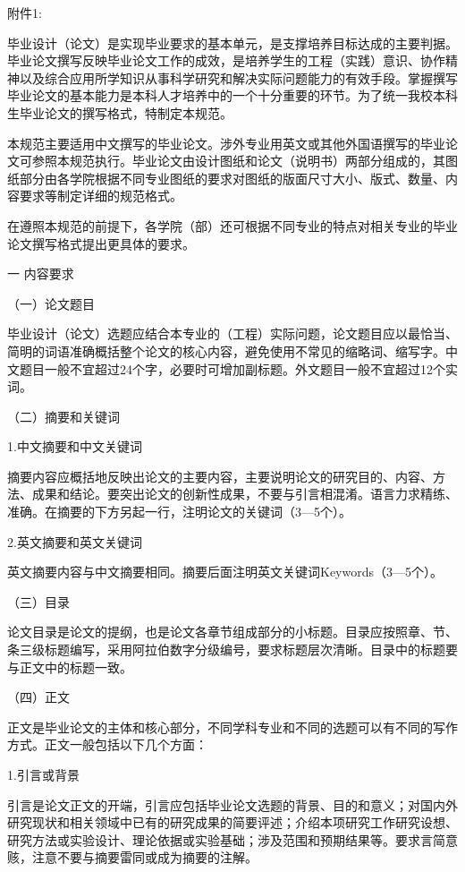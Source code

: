 \xiaosi \song
\noindent 附件1:
\begin{center}
    \hei\sihao{\appendixtitle}
\end{center}
\vspace*{14pt} %

毕业设计（论文）是实现毕业要求的基本单元，是支撑培养目标达成的主要判据。毕业论文撰写反映毕业论文工作的成效，是培养学生的工程（实践）意识、协作精神以及综合应用所学知识从事科学研究和解决实际问题能力的有效手段。掌握撰写毕业论文的基本能力是本科人才培养中的一个十分重要的环节。为了统一我校本科生毕业论文的撰写格式，特制定本规范。

本规范主要适用中文撰写的毕业论文。涉外专业用英文或其他外国语撰写的毕业论文可参照本规范执行。毕业论文由设计图纸和论文（说明书）两部分组成的，其图纸部分由各学院根据不同专业图纸的要求对图纸的版面尺寸大小、版式、数量、内容要求等制定详细的规范格式。

在遵照本规范的前提下，各学院（部）还可根据不同专业的特点对相关专业的毕业论文撰写格式提出更具体的要求。

一 \quad 内容要求

（一）论文题目

毕业设计（论文）选题应结合本专业的（工程）实际问题，论文题目应以最恰当、简明的词语准确概括整个论文的核心内容，避免使用不常见的缩略词、缩写字。中文题目一般不宜超过24个字，必要时可增加副标题。外文题目一般不宜超过12个实词。

（二）摘要和关键词

1.中文摘要和中文关键词

摘要内容应概括地反映出论文的主要内容，主要说明论文的研究目的、内容、方法、成果和结论。要突出论文的创新性成果，不要与引言相混淆。语言力求精练、准确。在摘要的下方另起一行，注明论文的关键词（3—5个）。

2.英文摘要和英文关键词

英文摘要内容与中文摘要相同。摘要后面注明英文关键词Keywords（3—5个）。

（三）目录

论文目录是论文的提纲，也是论文各章节组成部分的小标题。目录应按照章、节、条三级标题编写，采用阿拉伯数字分级编号，要求标题层次清晰。目录中的标题要与正文中的标题一致。

（四）正文

正文是毕业论文的主体和核心部分，不同学科专业和不同的选题可以有不同的写作方式。正文一般包括以下几个方面：

1.引言或背景

引言是论文正文的开端，引言应包括毕业论文选题的背景、目的和意义；对国内外研究现状和相关领域中已有的研究成果的简要评述；介绍本项研究工作研究设想、研究方法或实验设计、理论依据或实验基础；涉及范围和预期结果等。要求言简意赅，注意不要与摘要雷同或成为摘要的注解。

